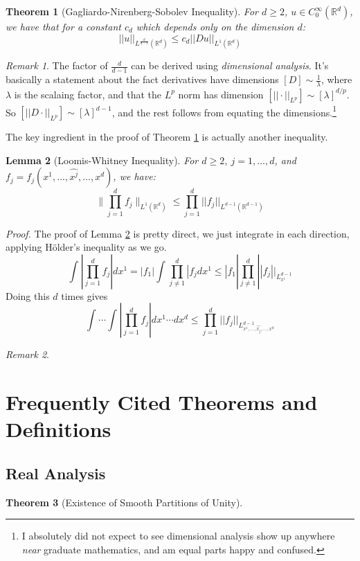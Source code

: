 \documentclass[letterpaper,10pt]{article}
\theoremstyle{definition}
\theoremstyle{remark}
\newtheorem*{rmk}{Remark}
\theoremstyle{plain}
\newtheorem{thm}{Theorem}[section]
\newtheorem{lem}[thm]{Lemma}
\renewenvironment{proof}{
    \vspace{5pt}
    \begin{mdframed}[bottomline=false,topline=false,rightline=false, skipabove=0]
    \noindent\textit{Proof.}}
{
    \hspace{\fill}\qedsymbol
    \end{mdframed}
}
\begin{document}
\begin{thm}[Gagliardo-Nirenberg-Sobolev Inequality]\label{thm:gagnirsobineq}
    For $d\geq 2$, $u\in C^\infty_0(\mathbb R^d)$, we have that for a constant
    $c_d$ which depends only on the dimension $d$:
    $$
        ||u||_{L^{\frac{d}{d-1}}(\mathbb R^d)}\leq c_d ||Du||_{L^1(\mathbb R^d)}
    $$
\end{thm}
\begin{rmk}
    The factor of $\frac{d}{d-1}$ can be derived using \emph{dimensional analysis}. %
    It's basically a statement about the fact derivatives have dimensions $[D]\sim\frac{1}{\lambda}$,
    where $\lambda$ is the scalaing factor, and that the $L^p$ norm
    has dimension $[||\cdot||_{L^p}]\sim[\lambda]^{d/p}$.
    So $[||D\cdot||_{L^p}]\sim[\lambda]^{d-1}$, and the rest follows from
    equating the dimensions.\footnote{I absolutely did not expect to see dimensional
    analysis show up anywhere \emph{near} graduate mathematics, and am equal parts
    happy and confused.}
\end{rmk}
The key ingredient in the proof of Theorem \ref{thm:gagnirsobineq} is 
actually another inequality.
\begin{lem}[Loomis-Whitney Inequality]\label{lem:loomiswhitney}
   For $d\geq 2$, $j=1,\ldots,d$, and 
   $f_j=f_j(x^1,\ldots,\widehat{x^j},\ldots,x^d)$,
   we have:
   $$
    \|\prod_{j=1}^df_j\|_{L^1(\mathbb R^d)}
    \leq
    \prod_{j=1}^d||f_j||_{L^{d-1}(\mathbb R^{d-1})}
   $$
\end{lem}
\begin{proof}
The proof of Lemma \ref{lem:loomiswhitney} is pretty direct, we just 
integrate in each direction, applying H\"older's inequality as we go.
$$
\int_{}^{}|\prod_{j=1}^df_j|dx^1=|f_1|\int_{}^{}\prod_{j\neq 1}^d|f_jdx^1
\leq|f_1|\prod_{j\neq 1}^d||f_j||_{L_{x^1}^{d-1}}
$$
Doing this $d$ times gives
$$
    \int_{}^{}\cdots\int_{}^{}|\prod_{j=1}^df_j|dx^1\cdots dx^d
    \leq\prod_{j=1}^d||f_j||_{L^{d-1}_{x^1,\ldots,\widehat{x_j},\ldots,x^d}}
$$
\end{proof}
\begin{rmk}

\end{rmk}
\newpage
\appendix
\section{Frequently Cited Theorems and Definitions}
\subsection{Real Analysis}
\begin{thm}[Existence of Smooth Partitions of Unity]\label{thm:parunity}

\end{thm}
\end{document}
